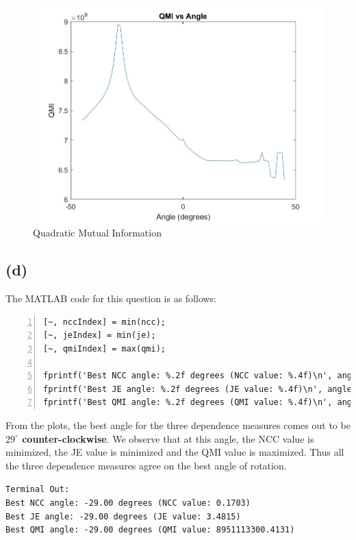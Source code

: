 \documentclass{article}
\begin{document}
\begin{figure}[H]
\centering
\includegraphics[scale=0.3]{./Q5/QMI_vs_Angle.jpg}
\caption{Quadratic Mutual Information}
\end{figure}

\subsection*{(d)}

The MATLAB code for this question is as follows:
\begin{lstlisting}[frame=single,numbers=left,style=Matlab-Pyglike,breaklines=true,postbreak=\mbox{\textcolor{red}{$\hookrightarrow$}\space}]
[~, nccIndex] = min(ncc);
[~, jeIndex] = min(je);
[~, qmiIndex] = max(qmi);

fprintf('Best NCC angle: %.2f degrees (NCC value: %.4f)\n', angles(nccIndex), ncc(nccIndex));
fprintf('Best JE angle: %.2f degrees (JE value: %.4f)\n', angles(jeIndex), je(jeIndex));
fprintf('Best QMI angle: %.2f degrees (QMI value: %.4f)\n', angles(qmiIndex), qmi(qmiIndex));    
\end{lstlisting}

From the plots, the best angle for the three dependence measures comes out to be \textbf{$29^{\circ}$ counter-clockwise}. We observe that at this angle, the NCC value is minimized, the JE value is minimized and the QMI value is maximized.
Thus all the three dependence measures agree on the best angle of rotation.

\vspace{5pt}
\texttt{Terminal Out:\\Best NCC angle: -29.00 degrees (NCC value: 0.1703)\\
Best JE angle: -29.00 degrees (JE value: 3.4815)\\
Best QMI angle: -29.00 degrees (QMI value: 8951113300.4131)}
\end{document}
